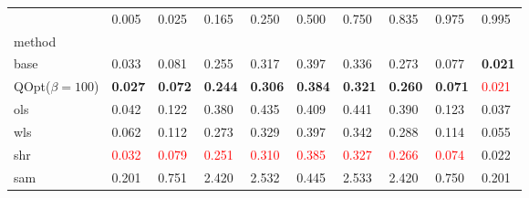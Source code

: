 \begin{tabular}{llllllllll}
\toprule
 & 0.005 & 0.025 & 0.165 & 0.250 & 0.500 & 0.750 & 0.835 & 0.975 & 0.995 \\
method &  &  &  &  &  &  &  &  &  \\
\midrule
base & 0.033 & 0.081 & 0.255 & 0.317 & 0.397 & 0.336 & 0.273 & 0.077 & \textbf{0.021} \\
\midrule
QOpt($\beta=100$) & \textbf{0.027} & \textbf{0.072} & \textbf{0.244} & \textbf{0.306} & \textbf{0.384} & \textbf{0.321} & \textbf{0.260} & \textbf{0.071} & \textcolor{red}{0.021} \\
ols & 0.042 & 0.122 & 0.380 & 0.435 & 0.409 & 0.441 & 0.390 & 0.123 & 0.037 \\
wls & 0.062 & 0.112 & 0.273 & 0.329 & 0.397 & 0.342 & 0.288 & 0.114 & 0.055 \\
shr & \textcolor{red}{0.032} & \textcolor{red}{0.079} & \textcolor{red}{0.251} & \textcolor{red}{0.310} & \textcolor{red}{0.385} & \textcolor{red}{0.327} & \textcolor{red}{0.266} & \textcolor{red}{0.074} & 0.022 \\
sam & 0.201 & 0.751 & 2.420 & 2.532 & 0.445 & 2.533 & 2.420 & 0.750 & 0.201 \\
\bottomrule
\end{tabular}